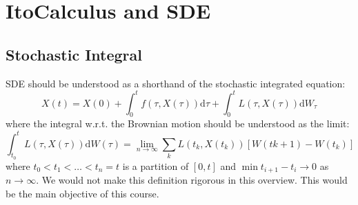 \newcommand{\ito}{Ito}
\section{\ito Calculus and SDE}
\subsection{Stochastic Integral}

SDE should be understood as a shorthand of the stochastic integrated equation:
$$
X(t)=X(0)+\int_{0}^{t} f(\tau,X(\tau))\mathrm{d}\tau + \int_{0}^{t}L(\tau,X(\tau))\mathrm{d}W_\tau
$$
where the integral w.r.t. the Brownian motion should be understood as the limit:
$$
\int_{t_0}^{t}L(\tau,X(\tau))\mathrm{d}W(\tau) = \lim_{n \to \infty}  \sum_{k}L(t_k,X(t_k))\left[ W(t{k+1})-W(t_k) \right] 
$$
where $t_0<t_1<\dots<t_n = t$ is a partition of $[0,t]$ and $\min t_{i+1} - t_i \to 0$ as $n\to \infty$.
We would not make this definition rigorous in this overview. This would be the main objective of this course.


